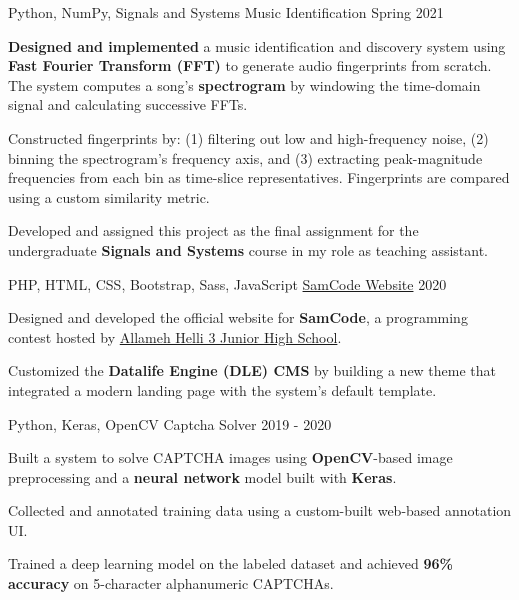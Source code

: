 \begin{cventries}
  \cventry
    {Python, NumPy, Signals and Systems} %
    {Music Identification} %
    {} %
    {Spring 2021} %
    {
      \begin{cvitems} %
      	\item {\textbf{Designed and implemented} a music identification and discovery system using \textbf{Fast Fourier Transform (FFT)} to generate audio fingerprints from scratch. The system computes a song's \textbf{spectrogram} by windowing the time-domain signal and calculating successive FFTs.}
        \item {Constructed fingerprints by: (1) filtering out low and high-frequency noise, (2) binning the spectrogram's frequency axis, and (3) extracting peak-magnitude frequencies from each bin as time-slice representatives. Fingerprints are compared using a custom similarity metric.}
        \item {Developed and assigned this project as the final assignment for the undergraduate \textbf{Signals and Systems} course in my role as teaching assistant.}
      \end{cvitems}
    }

  \cventry
    {PHP, HTML, CSS, Bootstrap, Sass, JavaScript} %
    {\href{https://samcode.allamehelli3.ir/}{SamCode Website}} %
    {} %
    {2020} %
    {
      \begin{cvitems} %
      \item {Designed and developed the official website for \textbf{SamCode}, a programming contest hosted by \href{http://helli3school.ir}{Allameh Helli 3 Junior High School}.}
      \item {Customized the \textbf{Datalife Engine (DLE) CMS} by building a new theme that integrated a modern landing page with the system’s default template.}
      \end{cvitems}
    }

  \cventry
    {Python, Keras, OpenCV} %
    {Captcha Solver} %
    {} %
    {2019 - 2020} %
    {
      \begin{cvitems} %
        \item {Built a system to solve CAPTCHA images using \textbf{OpenCV}-based image preprocessing and a \textbf{neural network} model built with \textbf{Keras}.}
        \item {Collected and annotated training data using a custom-built web-based annotation UI.}
        \item {Trained a deep learning model on the labeled dataset and achieved \textbf{96\% accuracy} on 5-character alphanumeric CAPTCHAs.}
      \end{cvitems}
    }


\end{cventries}
